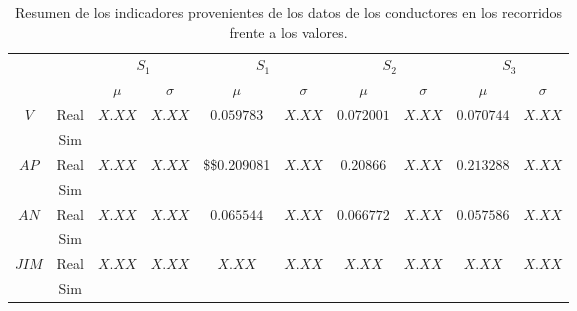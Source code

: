 \begin{table*}
	\centering
	\caption[Indicadores reales frente a indicadores capturados en simulación]{Resumen de los indicadores provenientes de los datos de los conductores en los recorridos frente a los valores.}
	\label{tbl:global-comparison-indicators}
	\begin{tabular}{cccccccccc}
		\multicolumn{2}{c}{}                   & \multicolumn{2}{c}{\textbf{$S_1$}}    & \multicolumn{2}{c}{\textbf{$S_1$}}          & \multicolumn{2}{c}{\textbf{$S_2$}}        & \multicolumn{2}{c}{\textbf{$S_3$}}        \\
		\multicolumn{2}{l}{}                   & $\mu$                      & $\sigma$ & $\mu$                            & $\sigma$ & $\mu$                          & $\sigma$ & $\mu$                          & $\sigma$ \\
		\multirow{2}{*}{\textbf{$V$}}   & Real & \multicolumn{1}{c}{$X.XX$} & $X.XX$   & \multicolumn{1}{c}{$0.059783$}   & $X.XX$   & \multicolumn{1}{c}{$0.072001$} & $X.XX$   & \multicolumn{1}{c}{$0.070744$} & $X.XX$   \\
		& Sim  &                            &          &                                  &          &                                &          &                                &          \\
		\multirow{2}{*}{\textbf{$AP$}}  & Real & \multicolumn{1}{c}{$X.XX$} & $X.XX$   & \multicolumn{1}{c}{\$\$0.209081} & $X.XX$   & \multicolumn{1}{c}{$0.20866$}  & $X.XX$   & \multicolumn{1}{c}{$0.213288$} & $X.XX$   \\
		& Sim  &                            &          &                                  &          &                                &          &                                &          \\
		\multirow{2}{*}{\textbf{$AN$}}  & Real & \multicolumn{1}{c}{$X.XX$} & $X.XX$   & \multicolumn{1}{c}{$0.065544$}   & $X.XX$   & \multicolumn{1}{c}{$0.066772$} & $X.XX$   & \multicolumn{1}{c}{$0.057586$} & $X.XX$   \\
		& Sim  &                            &          &                                  &          &                                &          &                                &          \\
		\multirow{2}{*}{\textbf{$JIM$}} & Real & \multicolumn{1}{c}{$X.XX$} & $X.XX$   & \multicolumn{1}{c}{$X.XX$}       & $X.XX$   & \multicolumn{1}{c}{$X.XX$}     & $X.XX$   & \multicolumn{1}{c}{$X.XX$}     & $X.XX$   \\
		& Sim  &                            &          &                                  &          &                                &          &                                &          \\

\end{tabular}
\end{table*}
